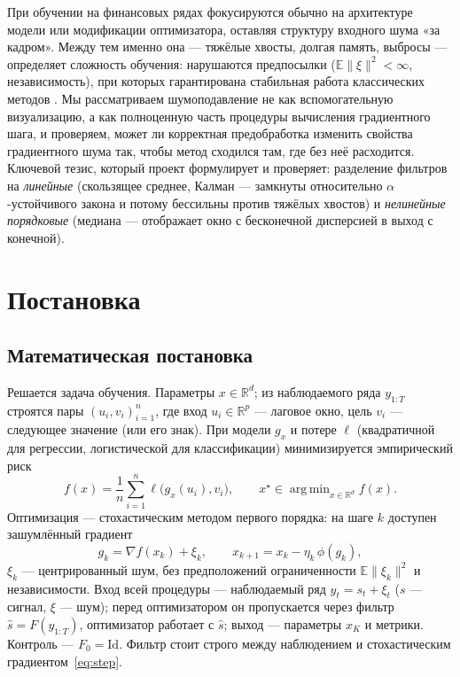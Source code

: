 \documentclass[conference]{IEEEtran}
\newcommand{\R}{\mathbb{R}}
\newcommand{\E}{\mathbb{E}}
\DeclareMathOperator*{\argmin}{arg\,min}
\begin{document}
При обучении на финансовых рядах фокусируются обычно на архитектуре
модели или модификации оптимизатора, оставляя структуру входного шума
«за кадром». Между тем именно она --- тяжёлые хвосты, долгая память,
выбросы --- определяет сложность обучения: нарушаются предпосылки
($\E\|\xi\|^2<\infty$, независимость), при которых гарантирована
стабильная работа классических методов \cite{cont2001,mandelbrot1963,
simsekli2019tailindex}. Мы рассматриваем шумоподавление не как
вспомогательную визуализацию, а как полноценную часть процедуры
вычисления градиентного шага, и проверяем, может ли корректная
предобработка изменить свойства градиентного шума так, чтобы метод
сходился там, где без неё расходится. Ключевой тезис, который проект
формулирует и проверяет: разделение фильтров на \emph{линейные}
(скользящее среднее, Калман --- замкнуты относительно $\alpha$-устойчивого
закона и потому бессильны против тяжёлых хвостов) и \emph{нелинейные
порядковые} (медиана --- отображает окно с бесконечной дисперсией в
выход с конечной).

\section{Постановка}

\subsection{Математическая постановка}
Решается задача обучения. Параметры $x\in\R^d$; из наблюдаемого ряда
$y_{1:T}$ строятся пары $(u_i,v_i)_{i=1}^n$, где вход $u_i\in\R^p$ ---
лаговое окно, цель $v_i$ --- следующее значение (или его знак). При
модели $g_x$ и потере $\ell$ (квадратичной для регрессии,
логистической для классификации) минимизируется эмпирический риск
\begin{equation}
f(x)=\frac1n\sum_{i=1}^n\ell\!\big(g_x(u_i),v_i\big),\qquad
x^\star\in\argmin_{x\in\R^d}f(x). \label{eq:risk}
\end{equation}
Оптимизация --- стохастическим методом первого порядка: на шаге $k$
доступен зашумлённый градиент
\begin{equation}
g_k=\nabla f(x_k)+\xi_k,\qquad x_{k+1}=x_k-\eta_k\,\phi(g_k),
\label{eq:step}
\end{equation}
$\xi_k$ --- центрированный шум, без предположений ограниченности
$\E\|\xi_k\|^2$ и независимости. Вход всей процедуры --- наблюдаемый
ряд $y_t=s_t+\xi_t$ ($s$ --- сигнал, $\xi$ --- шум); перед оптимизатором
он пропускается через фильтр $\hat s=F(y_{1:T})$, оптимизатор работает
с $\hat s$; выход --- параметры $x_K$ и метрики. Контроль ---
$F_0=\mathrm{Id}$. Фильтр стоит строго между наблюдением и
стохастическим градиентом~\eqref{eq:step}.
\end{document}
